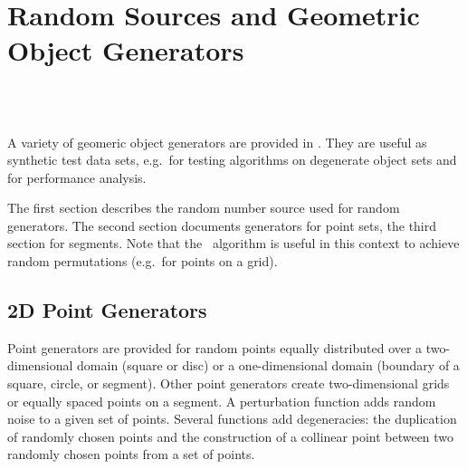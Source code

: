 
\beforecprogskip\medskipamount
\aftercprogskip\medskipamount
\ccParDims

\chapter{Random Sources and Geometric Object Generators}
\label{chapterGenerators}
\\
\\


A variety of geomeric object generators are provided in \cgal. They
are useful as synthetic test data sets, e.g.~for testing algorithms on
degenerate object sets and for performance analysis.

The first section describes the random number source used for random
generators. The second section documents generators for point sets,
the third section for segments. Note that the \stl\ algorithm
 is useful in this context to achieve random
permutations (e.g.~for points on a grid).




\newpage
\section{2D Point Generators}

\ccDefinition

Point generators are provided for random points equally distributed
over a two-dimensional domain (square or disc) or a one-dimensional
domain (boundary of a square, circle, or segment). Other point
generators create two-dimensional grids or equally spaced points on a
segment. A perturbation function adds random noise to a given set of
points. Several functions add degeneracies: the duplication of randomly
chosen points and the construction of a collinear point between two randomly
chosen points from a set of points.


